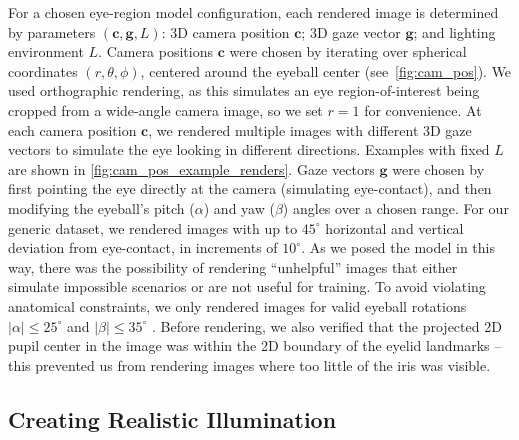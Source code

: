 For a chosen eye-region model configuration, each rendered image is determined by parameters $(\mathbf{c}, \mathbf{g}, L)$: 3D camera position $\mathbf{c}$; 3D gaze vector $\mathbf{g}$; and lighting environment $L$.
Camera positions $\mathbf{c}$ were chosen by iterating over spherical coordinates $(r, \theta, \phi)$, centered around the eyeball center (see~\autoref{fig:cam_pos}).
We used orthographic rendering, as this simulates an eye region-of-interest being cropped from a wide-angle camera image, so we set $r\!=\!1$ for convenience.
At each camera position $\mathbf{c}$, we rendered multiple images with different 3D gaze vectors to simulate the eye looking in different directions.
Examples with fixed $L$ are shown in \autoref{fig:cam_pos_example_renders}.
Gaze vectors $\mathbf{g}$ were chosen by first pointing the eye directly at the camera (simulating eye-contact), and then modifying the eyeball's pitch ($\alpha$) and yaw ($\beta$) angles over a chosen range.
For our generic dataset, we rendered images with up to $45^{\circ}$ horizontal and vertical deviation from eye-contact, in increments of $10^{\circ}$.
%
As we posed the model in this way, there was the possibility of rendering ``unhelpful'' images that either simulate impossible scenarios or are not useful for training.
To avoid violating anatomical constraints, we only rendered images for valid eyeball rotations $|\alpha|\!\leq\!25^{\circ}$ and $|\beta|\!\leq\!35^{\circ}$ \cite{MIL-STD-1472G}.
Before rendering, we also verified that the projected 2D pupil center in the image was within the 2D boundary of the eyelid landmarks -- this prevented us from rendering images where too little of the iris was visible.

\subsection{Creating Realistic Illumination}

